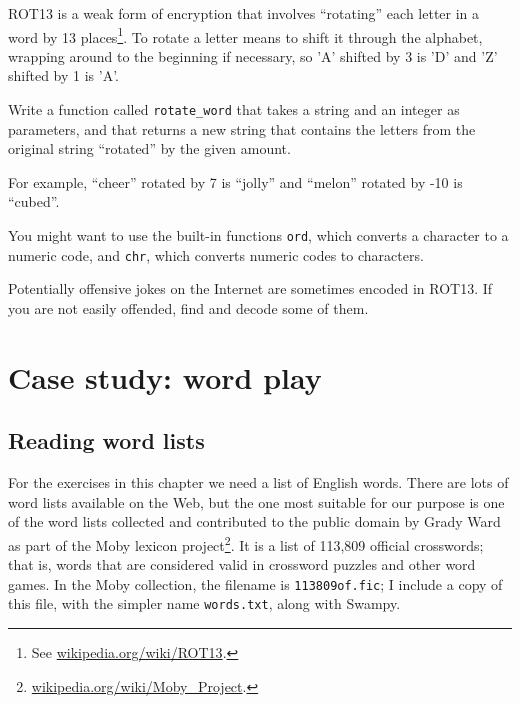 \documentclass[10pt]{book}
\begin{document}
\begin{ex}

\label{exrotate}
ROT13 is a weak form of encryption that involves ``rotating'' each
letter in a word by 13 places\footnote{See
  \url{wikipedia.org/wiki/ROT13}.}.  To rotate a letter means
to shift it through the alphabet, wrapping around to the beginning if
necessary, so 'A' shifted by 3 is 'D' and 'Z' shifted by 1 is 'A'.

Write a function called \verb"rotate_word"
that takes a string and an integer as parameters, and that returns
a new string that contains the letters from the original string
``rotated'' by the given amount.  

For example, ``cheer'' rotated by 7 is ``jolly'' and ``melon'' rotated
by -10 is ``cubed''.  


You might want to use the built-in functions {\tt ord}, which converts
a character to a numeric code, and {\tt chr}, which converts numeric
codes to characters.

Potentially offensive jokes on the Internet are sometimes encoded
in ROT13.  If you are not easily offended, find and decode some
of them.
\end{ex}


\chapter{Case study: word play}

\section{Reading word lists}
\label{wordlist}

For the exercises in this chapter we need a list of English words.
There are lots of word lists available on the Web, but the one most
suitable for our purpose is one of the word lists collected and
contributed to the public domain by Grady Ward as part of the Moby
lexicon project\footnote{\url{wikipedia.org/wiki/Moby_Project}.}.  It
is a list of 113,809 official crosswords; that is, words that are
considered valid in crossword puzzles and other word games.  In the
Moby collection, the filename is {\tt 113809of.fic}; I include a copy
of this file, with the simpler name {\tt words.txt}, along with
Swampy.

\end{document}
